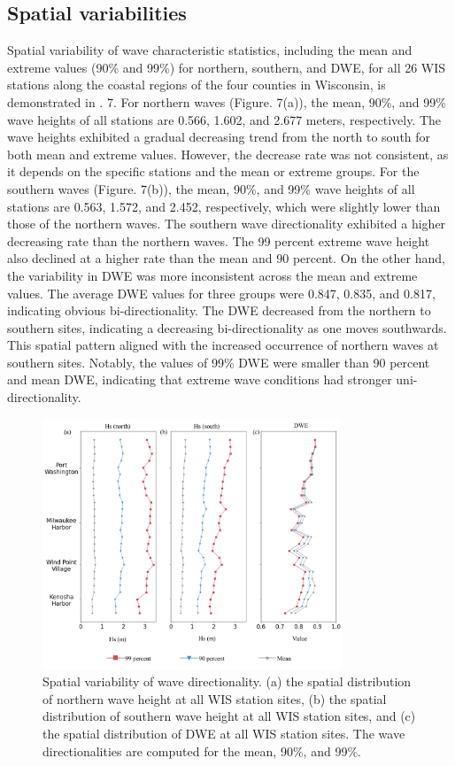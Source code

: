 \subsection{Spatial variabilities}
\label{Spatial variabilities}
Spatial variability of wave characteristic statistics, including the mean and extreme values (90\% and 99\%) for northern, southern, and DWE, for all 26 WIS stations along the coastal regions of the four counties in Wisconsin, is demonstrated in . 7. For northern waves (Figure. 7(a)), the mean, 90\%, and 99\% wave heights of all stations are 0.566, 1.602, and 2.677 meters, respectively. The wave heights exhibited a gradual decreasing trend from the north to south for both mean and extreme values. However, the decrease rate was not consistent, as it depends on the specific stations and the mean or extreme groups. For the southern waves (Figure. 7(b)), the mean, 90\%, and 99\% wave heights of all stations are 0.563, 1.572, and 2.452, respectively, which were slightly lower than those of the northern waves. The southern wave directionality exhibited a higher decreasing rate than the northern waves. The 99 percent extreme wave height also declined at a higher rate than the mean and 90 percent. On the other hand, the variability in DWE was more inconsistent across the mean and extreme values. The average DWE values for three groups were 0.847, 0.835, and 0.817, indicating obvious bi-directionality. The DWE decreased from the northern to southern sites, indicating a decreasing bi-directionality as one moves southwards. This spatial pattern aligned with the increased occurrence of northern waves at southern sites. Notably, the values of 99\% DWE were smaller than 90 percent and mean DWE, indicating that extreme wave conditions had stronger uni-directionality. 

\begin{figure}[htbp]
  \centering
  \includegraphics[width=0.8\textwidth]{chapter3/resources/figure3-7.jpg}
  \caption{Spatial variability of wave directionality. (a) the spatial distribution of northern wave height at all WIS station sites, (b) the spatial distribution of southern wave height at all WIS station sites, and (c) the spatial distribution of DWE at all WIS station sites. The wave directionalities are computed for the mean, 90$\%$, and 99$\%$.}
  \label{fig:fig3.7}
\end{figure}

